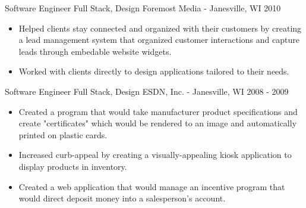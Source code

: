 \documentclass[]{clean-resume}
\begin{document}
\entry
	{Software Engineer}
	{Full Stack, Design}
	{Foremost Media - Janesville, WI}
	{2010}
	{
		\begin{itemize}
			\item Helped clients stay connected and organized with their customers by creating a lead management system that organized customer interactions and capture leads through embedable website widgets.

			\item Worked with clients directly to design applications tailored to their needs.
		\end{itemize}
		
	}

\newpage

\entry
	{Software Engineer}
	{Full Stack, Design}
	{ESDN, Inc. - Janesville, WI}
	{2008 - 2009}
	{
		\begin{itemize}
			\item Created a program that would take manufacturer product specifications and create "certificates" which would be rendered to an image and automatically printed on plastic cards.

			\item Increased curb-appeal by creating a visually-appealing kiosk application to display products in inventory.

			\item Created a web application that would manage an incentive program that would direct deposit money into a salesperson's account.
		\end{itemize}
		
	}
\end{document}
